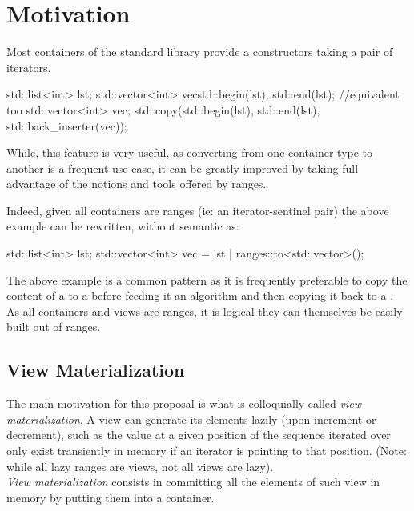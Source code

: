 \documentclass{wg21}
\begin{document}
\section{Motivation}

Most containers of the standard library provide a constructors taking a pair of iterators.

\begin{colorblock}
    std::list<int> lst;
    std::vector<int> vec{std::begin(lst), std::end(lst)};
    //equivalent too
    std::vector<int> vec;
    std::copy(std::begin(lst), std::end(lst), std::back_inserter(vec));
\end{colorblock}

While, this feature is very useful, as converting from one container type to another is a frequent
use-case, it can be greatly improved by taking full advantage of the notions and tools offered by ranges.

Indeed, given all containers are ranges (ie: an iterator-sentinel pair) the above example can be rewritten, without semantic as:

\begin{colorblock}
    std::list<int> lst;
    std::vector<int> vec = lst | ranges::to<std::vector>();
\end{colorblock}


The above example is a common pattern as it is frequently preferable to copy the content of a  to
a  before feeding it an algorithm and then copying it back to a .\\

As all containers and views are ranges, it is logical they can themselves be easily built out of ranges.

\subsection{View Materialization}

The main motivation for this proposal is what is colloquially called \emph{view materialization}.
A view can generate its elements lazily (upon increment or decrement), such as the value at a given position of the sequence
iterated over only exist transiently in memory if an iterator is pointing to that position.
(Note: while all lazy ranges are views, not all views are lazy).\\

\emph{View materialization} consists in committing all the elements of such view in memory by putting them into a container.
\end{document}
